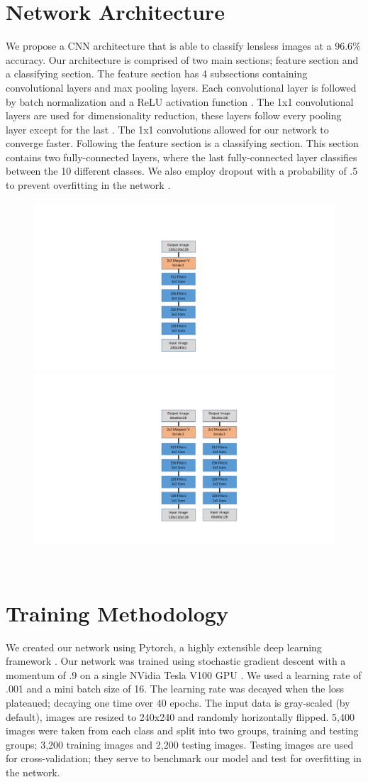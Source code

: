 \documentclass[11pt,conference]{ieeeconf}
\begin{document}
\section{Network Architecture}
We propose a CNN architecture that is able to classify lensless images at a 96.6\% accuracy. Our architecture is comprised of two main sections; feature section and a classifying section. The feature section has 4 subsections containing convolutional layers and max pooling layers. Each convolutional layer is followed by batch normalization and a ReLU activation function \cite{DBLP:journals/corr/IoffeS15, Nair:2010:RLU:3104322.3104425}. The 1x1 convolutional layers are used for dimensionality reduction, these layers follow every pooling layer except for the last \cite{DBLP:journals/corr/LinCY13}. The 1x1 convolutions allowed for our network to converge faster.
Following the feature section is a classifying section. This section contains two fully-connected layers, where the last fully-connected layer classifies between the 10 different classes. We also employ dropout with a probability of .5 to prevent overfitting in the network \cite{JMLR:v15:srivastava14a}.
\begin{figure}[!ht]
\begin{minipage}{\textwidth}
     \centering
     \includegraphics[width=.1\textwidth]{section1}\quad
     \includegraphics[width=.2\textwidth]{section2}\\
     \label{fig:sub1}
   \end{minipage}\\[1em]
\end{figure}
%
\section{Training Methodology}
We created our network using Pytorch, a highly extensible deep learning framework \cite{paszke2017automatic}. Our network was trained using stochastic gradient descent with a momentum of .9 on a single NVidia Tesla V100 GPU \cite{DBLP:journals/corr/KingmaB14, Sutskever:2013:IIM:3042817.3043064}. We used a learning rate of .001 and a mini batch size of 16. The learning rate was decayed when the loss plateaued; decaying one time over 40 epochs. The input data is gray-scaled (by default), images are resized to 240x240 and randomly horizontally flipped. 5,400 images were taken from each class and split into two groups, training and testing groups; 3,200 training images and 2,200 testing images. Testing images are used for cross-validation; they serve to benchmark our model and test for overfitting in the network.
%
\end{document}

